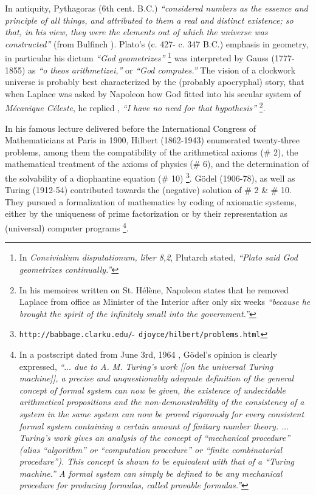 \documentclass[pre,preprint,showpacs,showkeys,amsfonts]{revtex4}
\begin{document}
In antiquity,
 Pythagoras (6th cent. B.C.)
{\it ``considered numbers as the essence and principle of all things,
and attributed to them a real and distinct existence;
so that, in his view, they were the elements out of which the universe was constructed''}
(from Bulfinch \cite{Bulfinch}).
Plato's (c. 427- c. 347 B.C.) emphasis in geometry, in particular his dictum
{\it ``God geometrizes''} \footnote{ In {\it Convivialium disputationum, liber 8,2},
Plutarch stated, {\it ``Plato said God geometrizes continually.''}}
was interpreted by Gauss (1777-1855) as
{\it ``o theos arithmetizei,''} or {\it ``God computes.''}
The vision of a clockwork universe is probably best characterized
by the (probably apocryphal) story, that when Laplace was asked by Napoleon
how God fitted into his secular system of {\it M\'ecanique C\'eleste}, he replied
\cite[p. 538]{boyer},
{\it ``I have no need for that hypothesis''}
\footnote{
In his memoires written on St. H\'el\`ene, Napoleon states that
he removed Laplace from office as Minister of the Interior
\cite[p. 536]{boyer} after only six weeks
{\it ``because he brought the spirit of the infinitely small into the government.''}
}.

In his famous
lecture delivered before the International Congress of Mathematicians at Paris in 1900,
Hilbert (1862-1943) enumerated
twenty-three problems, among them
the compatibility of the arithmetical axioms  (\# 2),
the mathematical treatment of the axioms of physics  (\# 6), and the
determination of the solvability of a diophantine equation  (\# 10)
\footnote{
{\tt http://babbage.clarku.edu/}$\widetilde{\;\;}\,${\tt djoyce/hilbert/problems.html}
}.
G\"odel (1906-78), as well as Turing (1912-54)
contributed towards the (negative) solution of \# 2 \& \# 10.
They pursued a formalization of mathematics by coding of axiomatic systems,
either by the uniqueness of prime factorization
or by their representation as (universal) computer programs
\footnote{
In a postscript dated from June 3rd, 1964 \cite[p. 369-370]{godel-ges1},
G\"odel's opinion is clearly expressed,
{\em ``$\ldots $ due to A. M. Turing's work [[on the universal Turing machine]],
a precise and unquestionably adequate definition of the general
concept of formal system can now be given,
the existence of undecidable arithmetical propositions and
the non-demonstrability of the consistency of a
system in the same system can now be proved rigorously
for every consistent formal system containing
a certain amount of finitary number theory.
$\ldots $
Turing's work gives an analysis of the concept of
``mechanical procedure''
(alias ``algorithm'' or ``computation procedure'' or ``finite combinatorial procedure'').
This concept is shown to be equivalent with that of a ``Turing machine.''
A formal system can simply be defined to be any
mechanical procedure for producing formulas, called provable formulas.''}
}.
\end{document}
